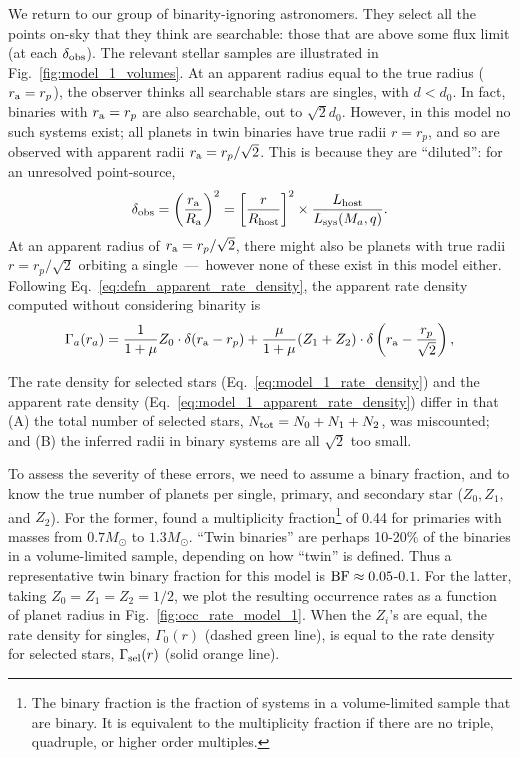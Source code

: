 \documentclass[12pt,modern]{aastex61}
\renewcommand{\a}{_{\rm a}}
\begin{document}
We return to our group of binarity-ignoring astronomers. They select all the 
points on-sky that they think are searchable: those that are above some flux 
limit (at each $\delta_{\rm obs}$).
The relevant stellar samples are illustrated in Fig.~\ref{fig:model_1_volumes}.
At an apparent radius equal to the true radius ($r\a=r_p$), the observer 
thinks all searchable stars are singles, with $d<d_0$.
In fact, binaries with $r\a=r_p$ are also searchable, out to $\sqrt{2}d_0$. 
However, in this model no such systems exist; all planets in twin binaries 
have true radii $r=r_p$, and so are observed with apparent radii 
$r\a=r_p/\sqrt{2}$.
This is because they are ``diluted'':
for an unresolved point-source,
\begin{equation}
\delta_{\rm obs}
= \left({r\a \over R\a}\right)^2
= \left[{r\over R_{\rm host}}\right]^2\times {L_{\rm host} \over L_{\rm 
sys}(M_a, q)}.
\label{eq:delta_obs_general} 
\end{equation}
At an apparent radius of $r\a=r_p/\sqrt{2}$, there might also be planets with 
true radii $r=r_p/\sqrt{2}$ orbiting a single~---~however none of these exist 
in this model either.
Following Eq.~\ref{eq:defn_apparent_rate_density}, the apparent rate density 
computed without considering binarity is
\begin{equation}
\Gamma_a(r_a) = 
\frac{1}{1+\mu} Z_0 \cdot
\delta(r\a-r_p)  +
\frac{\mu}{1+\mu} (Z_1 + Z_2) \cdot
\delta\left(r\a-\frac{r_p}{\sqrt{2}} \right),
\label{eq:model_1_apparent_rate_density}
\end{equation}

The rate density for selected stars (Eq.~\ref{eq:model_1_rate_density}) and the
apparent rate density (Eq.~\ref{eq:model_1_apparent_rate_density}) differ in 
that (A) the total number of selected stars, $N_{\rm tot} = N_0+N_1+N_2$, was 
miscounted; and (B) the inferred radii in binary systems are all $\sqrt{2}$ 
too small.

To assess the severity of these errors, we need to assume a binary fraction, 
and to know the true number of planets per single, primary, and secondary star 
($Z_0,Z_1,$ and $Z_2$).
For the former,
\citet{raghavan_survey_2010} found a multiplicity 
fraction\footnote{
    The binary fraction is the fraction of systems in a volume-limited sample 
    that are binary. It is equivalent to the multiplicity fraction if there 
    are no triple, quadruple, or higher order multiples.
} of 0.44 for primaries with masses from $0.7M_\odot$ to $1.3M_\odot$. 
``Twin binaries'' are perhaps 10-20\% of the binaries in a volume-limited 
sample, depending on how ``twin'' is defined.
Thus a representative twin binary fraction for this model is ${\rm BF}\approx 
0.05$-$0.1$. 
For the latter, taking $Z_0=Z_1=Z_2=1/2$, we plot the resulting occurrence 
rates as a function of planet radius in Fig.~\ref{fig:occ_rate_model_1}.
When the $Z_i$'s are equal, the rate density for singles, $\Gamma_0(r)$ 
(dashed green line), is equal to the rate density for selected stars, 
$\Gamma_{\rm sel}(r)$ (solid orange line).
\end{document}
